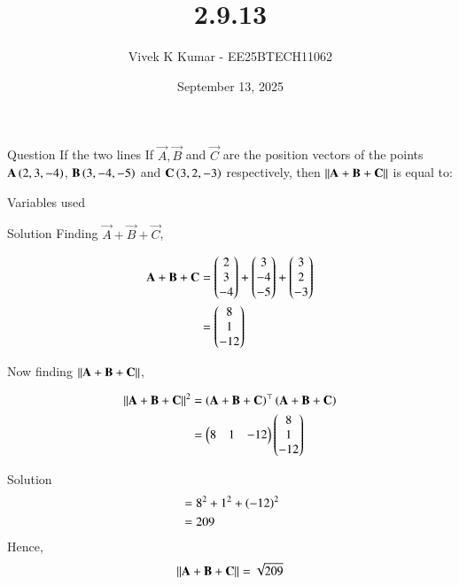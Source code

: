 \documentclass{beamer}
\title 
{2.9.13}
\date{September 13, 2025}
\author 
{Vivek K Kumar - EE25BTECH11062}
\begin{document}
\frame{\titlepage}
\begin{frame}{Question}
If the two lines 
If $\vec{A}, \vec{B}$ and $\vec{C}$ are the position vectors of the points $\mathbf{A}\left(2, 3, -4\right)$, $\mathbf{B}\left(3, -4, -5\right)$ and $\mathbf{C}\left(3, 2, -3\right)$ respectively, then $\left\lVert\mathbf{A}+\mathbf{B}+\mathbf{C}\right\rVert$ is equal to: 
\end{frame}



\begin{frame}{Variables used}
\begin{table}[H]    
  \centering
  
  \caption{Variables Used}
  \label{tab:2.9.13}
\end{table}

\end{frame}

\begin{frame}{Solution}
Finding $\vec{A} + \vec{B} + \vec{C}$,

\begin{align}
\mathbf{A} + \mathbf{B} + \mathbf{C} &= \begin{pmatrix}2\\3\\-4\end{pmatrix} + \begin{pmatrix}3\\-4\\-5\end{pmatrix} + \begin{pmatrix}3\\2\\-3\end{pmatrix}\\
&= \begin{pmatrix}8\\1\\-12\end{pmatrix}
\end{align}

Now finding $\left\lVert\mathbf{A} + \mathbf{B} + \mathbf{C}\right\rVert$,

\begin{align}
\left\lVert\mathbf{A} + \mathbf{B} + \mathbf{C}\right\rVert^2 &= \left(\mathbf{A+B+C}\right)^\top\left(\mathbf{A+B+C}\right) \\
&= \begin{pmatrix}8 & 1 & -12\end{pmatrix}\begin{pmatrix}8 \\ 1 \\ -12\end{pmatrix}
\end{align}
\end{frame}
\begin{frame}{Solution}
\begin{align}
&= 8^2 + 1^2 + \left(-12\right)^2\\
&= 209
\end{align}
Hence, 
\begin{align}
\left\lVert\mathbf{A+B+C}\right\rVert = \sqrt{209}
\end{align}

\end{frame}
\end{document}
